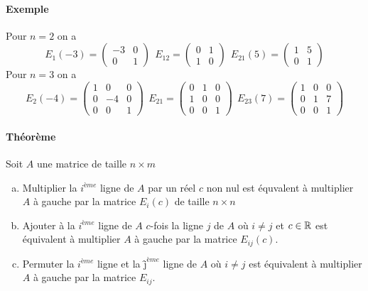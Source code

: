 \paragraph{Exemple} Pour $n = 2$ on a
$$E_1(-3) = \begin{pmatrix} -3 & 0 \\ 0 & 1 \end{pmatrix} ~~ 
  E_{1 2} = \begin{pmatrix} 0 & 1 \\ 1 &  0 \end{pmatrix} ~~ 
  E_{2 1}(5) = \begin{pmatrix} 1 & 5 \\ 0 & 1 \end{pmatrix}$$
Pour $n = 3$ on a
$$E_2(-4) = \begin{pmatrix} 1 & 0 & 0 \\ 0 & -4 & 0 \\ 0 & 0 & 1 \end{pmatrix} ~~
  E_{2 1} = \begin{pmatrix} 0 & 1 & 0 \\ 1 & 0 & 0 \\ 0 & 0 & 1 \end{pmatrix} ~~
  E_{2 3}(7) = \begin{pmatrix} 1 & 0 & 0 \\ 0 & 1 & 7 \\ 0 & 0 & 1 \end{pmatrix}$$

\paragraph{Théorème} Soit $A$ une matrice de taille $n\times m$
\begin{enumerate}[a)]
  \item Multiplier la $i^{ème}$ ligne de $A$ par un réel $c$ non nul est équvalent à multiplier $A$ à gauche par la matrice $E_i(c)$ de taille $n \times n$
  
  \item Ajouter à la $i^{ème}$ ligne de $A$ $c$-fois la ligne $j$ de $A$ où $i\neq j$ et $c\in \mathbb{R}$ est équivalent à multiplier $A$ à gauche par la matrice $E_{ij}(c)$.
  
  \item Permuter la $i^{ème}$ ligne et la $ĵ^{ème}$ ligne de $A$ où $i\neq j$ est équivalent à multiplier $A$ à gauche par la matrice $E_{ij}$.
\end{enumerate}

